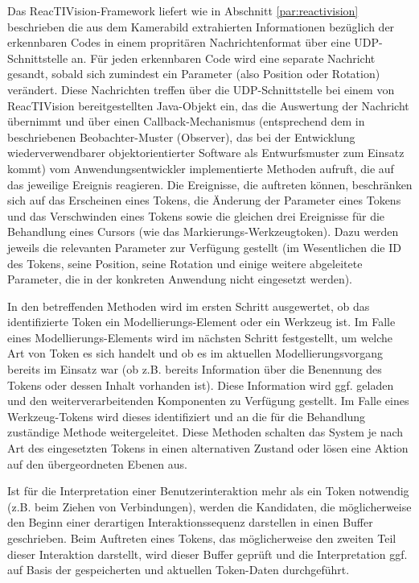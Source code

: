 Das ReacTIVision-Framework liefert wie in Abschnitt \ref{par:reactivision} beschrieben die aus dem Kamerabild extrahierten Informationen bezüglich der erkennbaren Codes in einem propritären Nachrichtenformat über eine UDP-Schnittstelle an. Für jeden erkennbaren Code wird eine separate Nachricht gesandt, sobald sich zumindest ein Parameter (also Position oder Rotation) verändert. Diese Nachrichten treffen über die UDP-Schnittstelle bei einem von ReacTIVision bereitgestellten Java-Objekt ein, das die Auswertung der Nachricht übernimmt und über einen Callback-Mechanismus (entsprechend dem in \citep{Gamma95} beschriebenen Beobachter-Muster (Observer), das bei der Entwicklung wiederverwendbarer objektorientierter Software als Entwurfsmuster zum Einsatz kommt) vom Anwendungsentwickler implementierte Methoden aufruft, die auf das jeweilige Ereignis reagieren. Die Ereignisse, die auftreten können, beschränken sich auf das Erscheinen eines Tokens, die Änderung der Parameter eines Tokens und das Verschwinden eines Tokens sowie die gleichen drei Ereignisse für die Behandlung eines Cursors (wie das Markierungs-Werkzeugtoken). Dazu werden jeweils die relevanten Parameter zur Verfügung gestellt (im Wesentlichen die ID des Tokens, seine Position, seine Rotation und einige weitere abgeleitete Parameter, die in der konkreten Anwendung nicht eingesetzt werden).

In den betreffenden Methoden wird im ersten Schritt ausgewertet, ob das identifizierte Token ein Modellierungs-Element oder ein Werkzeug ist. Im Falle eines Modellierungs-Elements wird im nächsten Schritt festgestellt, um welche Art von Token es sich handelt und ob es im aktuellen Modellierungsvorgang bereits im Einsatz war (ob z.B. bereits Information über die Benennung des Tokens oder dessen Inhalt vorhanden ist). Diese Information wird ggf. geladen und den weiterverarbeitenden Komponenten zu Verfügung gestellt. Im Falle eines Werkzeug-Tokens wird dieses identifiziert und an die für die Behandlung zuständige Methode weitergeleitet. Diese Methoden schalten das System je nach Art des eingesetzten Tokens in einen alternativen Zustand oder lösen eine Aktion auf den übergeordneten Ebenen aus.

Ist für die Interpretation einer Benutzerinteraktion mehr als ein Token notwendig (z.B. beim Ziehen von Verbindungen), werden die Kandidaten, die möglicherweise den Beginn einer derartigen Interaktionssequenz darstellen in einen Buffer geschrieben. Beim Auftreten eines Tokens, das möglicherweise den zweiten Teil dieser Interaktion darstellt, wird dieser Buffer geprüft und die Interpretation ggf. auf Basis der gespeicherten und aktuellen Token-Daten durchgeführt.

